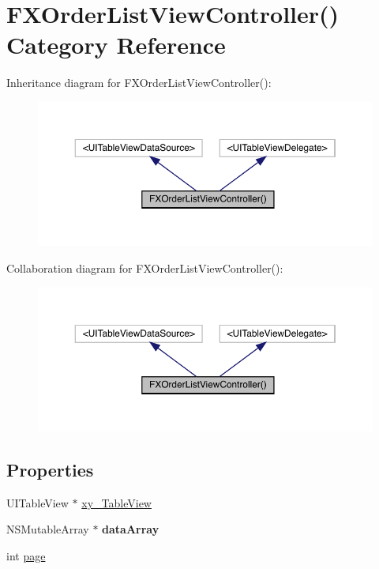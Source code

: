 \hypertarget{category_f_x_order_list_view_controller_07_08}{}\section{F\+X\+Order\+List\+View\+Controller() Category Reference}
\label{category_f_x_order_list_view_controller_07_08}


Inheritance diagram for F\+X\+Order\+List\+View\+Controller()\+:\nopagebreak
\begin{figure}[H]
\begin{center}
\leavevmode
\includegraphics[width=350pt]{category_f_x_order_list_view_controller_07_08__inherit__graph}
\end{center}
\end{figure}


Collaboration diagram for F\+X\+Order\+List\+View\+Controller()\+:\nopagebreak
\begin{figure}[H]
\begin{center}
\leavevmode
\includegraphics[width=350pt]{category_f_x_order_list_view_controller_07_08__coll__graph}
\end{center}
\end{figure}
\subsection*{Properties}
\begin{DoxyCompactItemize}
\item 
U\+I\+Table\+View $\ast$ \mbox{\hyperlink{category_f_x_order_list_view_controller_07_08_ae26b29ab674223b4d2b3358532456cae}{xy\+\_\+\+Table\+View}}
\item 
\mbox{\label{category_f_x_order_list_view_controller_07_08_a5d7d84fa262850453438daabe662f230}} 
N\+S\+Mutable\+Array $\ast$ {\bfseries data\+Array}
\item 
int \mbox{\hyperlink{category_f_x_order_list_view_controller_07_08_a9f289de2e1ba94a5b76c56506ef3a7f7}{page}}
\end{DoxyCompactItemize}


